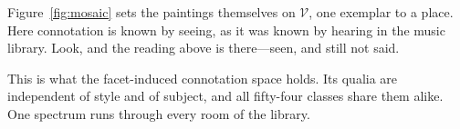 Figure~\ref{fig:mosaic} sets the paintings themselves on $\mathcal{V}$, one
exemplar to a place. Here connotation is known by seeing, as it was known by
hearing in the music library. Look, and the reading above is there---seen,
and still not said.

This is what the facet-induced connotation space holds. Its qualia are
independent of style and of subject, and all fifty-four classes share
them alike. One spectrum runs through every room of the library.
